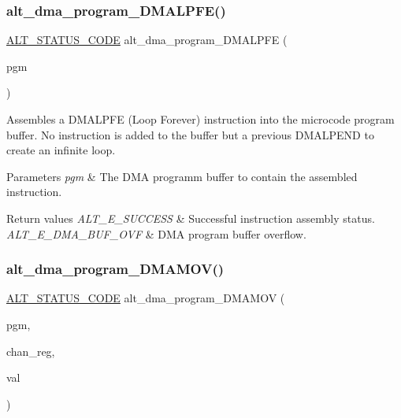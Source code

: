 \subsubsection{\texorpdfstring{alt\_dma\_program\_DMALPFE()}{alt\_dma\_program\_DMALPFE()}}
{\footnotesize\ttfamily \mbox{\hyperlink{hwlib_8h_abdb0d369f069723ca55d6c94bcaaaa12}{A\+L\+T\+\_\+\+S\+T\+A\+T\+U\+S\+\_\+\+C\+O\+DE}} alt\+\_\+dma\+\_\+program\+\_\+\+D\+M\+A\+L\+P\+FE (\begin{DoxyParamCaption}\item[{\mbox{\hyperlink{group__ALT__DMA__PRG_gadb7028531574894854db4db6d797de97}{A\+L\+T\+\_\+\+D\+M\+A\+\_\+\+P\+R\+O\+G\+R\+A\+M\+\_\+t}} $\ast$}]{pgm }\end{DoxyParamCaption})}

Assembles a D\+M\+A\+L\+P\+FE (Loop Forever) instruction into the microcode program buffer. No instruction is added to the buffer but a previous D\+M\+A\+L\+P\+E\+ND to create an infinite loop.


\begin{DoxyParams}{Parameters}
{\em pgm} & The D\+MA programm buffer to contain the assembled instruction.\\
\hline
\end{DoxyParams}

\begin{DoxyRetVals}{Return values}
{\em A\+L\+T\+\_\+\+E\+\_\+\+S\+U\+C\+C\+E\+SS} & Successful instruction assembly status. \\
\hline
{\em A\+L\+T\+\_\+\+E\+\_\+\+D\+M\+A\+\_\+\+B\+U\+F\+\_\+\+O\+VF} & D\+MA program buffer overflow. \\
\hline
\end{DoxyRetVals}
\mbox{\label{group__ALT__DMA__PRG_ga6f996a101038e030bb8f6613b147a781}} 
\subsubsection{\texorpdfstring{alt\_dma\_program\_DMAMOV()}{alt\_dma\_program\_DMAMOV()}}
{\footnotesize\ttfamily \mbox{\hyperlink{hwlib_8h_abdb0d369f069723ca55d6c94bcaaaa12}{A\+L\+T\+\_\+\+S\+T\+A\+T\+U\+S\+\_\+\+C\+O\+DE}} alt\+\_\+dma\+\_\+program\+\_\+\+D\+M\+A\+M\+OV (\begin{DoxyParamCaption}\item[{\mbox{\hyperlink{group__ALT__DMA__PRG_gadb7028531574894854db4db6d797de97}{A\+L\+T\+\_\+\+D\+M\+A\+\_\+\+P\+R\+O\+G\+R\+A\+M\+\_\+t}} $\ast$}]{pgm,  }\item[{\mbox{\hyperlink{group__ALT__DMA__PRG_ga772371a3d6334e110911154cf94950e8}{A\+L\+T\+\_\+\+D\+M\+A\+\_\+\+P\+R\+O\+G\+R\+A\+M\+\_\+\+R\+E\+G\+\_\+t}}}]{chan\+\_\+reg,  }\item[{uint32\+\_\+t}]{val }\end{DoxyParamCaption})}

